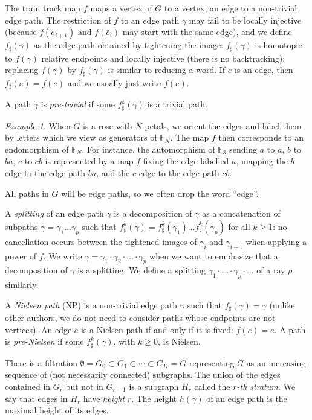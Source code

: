 \documentclass[11pt]{amsart}
\theoremstyle{remark}
\newtheorem{example}[thm]{Example}
\newcommand{\es}{\emptyset}
\newcommand{\inc}{\subset}
\newcommand {\F} {{\mathbb {F}}}
\begin{document}
 
The   train track map $f$ maps a vertex of $G$ to a vertex, an edge to a non-trivial edge path. The restriction of $f$ to an edge path $\gamma$ may fail to be locally injective (because $f(e_{i+1})$ and $f(\bar e_i)$ may start with the same edge), and we define $f_\sharp(\gamma)$ as the edge path obtained by tightening the image:   $f_\sharp(\gamma)$ is homotopic to $f(\gamma)$ relative endpoints and locally injective (there is no backtracking); replacing $f(\gamma)$ by $f_\sharp(\gamma)$ is similar to reducing a word.   If $e$ is an edge, then $f_\sharp(e)=f(e)$ and we usually just write $f(e)$.



A path $\gamma$ is \emph{pre-trivial} if some $f^k_\sharp (\gamma)
 $ is a trivial path. 
 \begin{example}

When $G$ is a rose with $N$ petals, we orient the edges and  label them by letters which we view as generators of $\F_N$. The map $f$ then corresponds to an endomorphism of $\F_N$. 
 For instance, the automorphism of $\F_3$ sending $a$ to $a$, $b$ to $ba$, $c$ to $cb$ is represented by a map $f$ fixing the edge labelled $a$, mapping the $b$ edge to the edge path $ba$, and the $c$ edge to the edge path $cb$. 
\end{example}
 
 All paths in $G$ will be edge paths, so we often drop the word ``edge''.
 
 A \emph{splitting} of an edge path $\gamma$ is a decomposition of $\gamma$ as a concatenation of subpaths $\gamma=\gamma_1\dots \gamma_p$ such that $f^k_\sharp(\gamma)=f^k_\sharp(\gamma_1)\dots f^k_\sharp(\gamma_p)$ for all $k\ge 1$:
  no cancellation occurs between the tightened images of $\gamma_i$ and $\gamma_{i+1}$ when applying a power of $f$. 
 We write $\gamma=\gamma_1\cdot\gamma_2\cdot {\dots} \cdot\gamma_p$ when we want to emphasize that a decomposition of $\gamma$ is a splitting. 
  We define a splitting $\gamma_1\cdot {\dots} \cdot \gamma_p \cdot {\dots}$ of a ray $\rho$ similarly.
 
 A \emph{Nielsen path} (NP) is a non-trivial  edge path $\gamma$ such that  $f_\sharp(\gamma)=\gamma$ (unlike other authors, we do not need to consider paths whose endpoints are not vertices). An edge $e$ is a Nielsen path if and only if it is fixed: $f(e)=e$.  A path is \emph{pre-Nielsen} if some $f^k_\sharp(\gamma)$, with $k\ge0$, is Nielsen. 
 
 There is a filtration $\es=G_0\inc G_1\inc\cdots\inc G_K=G$ representing $G$ as an increasing sequence of (not necessarily connected) subgraphs. The union of the edges contained in $G_r$ but not in $G_{r-1}$ is a subgraph $H_r$ called the \emph{$r$-th stratum.} We say that edges in $H_r$ have \emph{height} $r$. The height $h(\gamma)$ of an edge path is the maximal height of its edges. 
 
\end{document}
